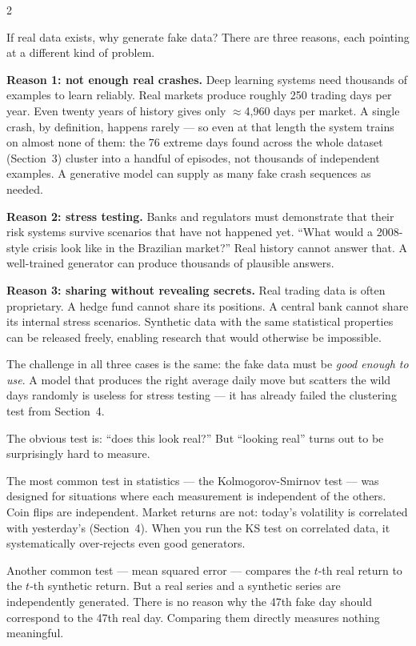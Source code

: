 \documentclass[10pt]{article}
\newcommand{\skybox}[2]{\begin{tcolorbox}[mybox={Sky}{BBg},title={#1}]#2\end{tcolorbox}}
\begin{document}
\begin{multicols}{2}

\skybox{5\quad Why Anyone Wants Synthetic Markets}{%
If real data exists, why generate fake data? There are three reasons, each pointing at a different kind of problem.

\medskip
\textbf{Reason 1: not enough real crashes.} Deep learning systems need thousands of examples to learn reliably. Real markets produce roughly 250 trading days per year. Even twenty years of history gives only $\approx$4{,}960 days per market. A single crash, by definition, happens rarely --- so even at that length the system trains on almost none of them: the 76 extreme days found across the whole dataset (Section~3) cluster into a handful of episodes, not thousands of independent examples. A generative model can supply as many fake crash sequences as needed.

\medskip
\textbf{Reason 2: stress testing.} Banks and regulators must demonstrate that their risk systems survive scenarios that have not happened yet. ``What would a 2008-style crisis look like in the Brazilian market?'' Real history cannot answer that. A well-trained generator can produce thousands of plausible answers.

\medskip
\textbf{Reason 3: sharing without revealing secrets.} Real trading data is often proprietary. A hedge fund cannot share its positions. A central bank cannot share its internal stress scenarios. Synthetic data with the same statistical properties can be released freely, enabling research that would otherwise be impossible.

\smallskip
The challenge in all three cases is the same: the fake data must be \emph{good enough to use}. A model that produces the right average daily move but scatters the wild days randomly is useless for stress testing --- it has already failed the clustering test from Section~4.}

\skybox{6\quad Why Judging It Is Hard}{%
The obvious test is: ``does this look real?'' But ``looking real'' turns out to be surprisingly hard to measure.

The most common test in statistics --- the Kolmogorov-Smirnov test --- was designed for situations where each measurement is independent of the others. Coin flips are independent. Market returns are not: today's volatility is correlated with yesterday's (Section~4). When you run the KS test on correlated data, it systematically over-rejects even good generators.

Another common test --- mean squared error --- compares the $t$-th real return to the $t$-th synthetic return. But a real series and a synthetic series are independently generated. There is no reason why the 47th fake day should correspond to the 47th real day. Comparing them directly measures nothing meaningful.

}
\end{multicols}
\end{document}
